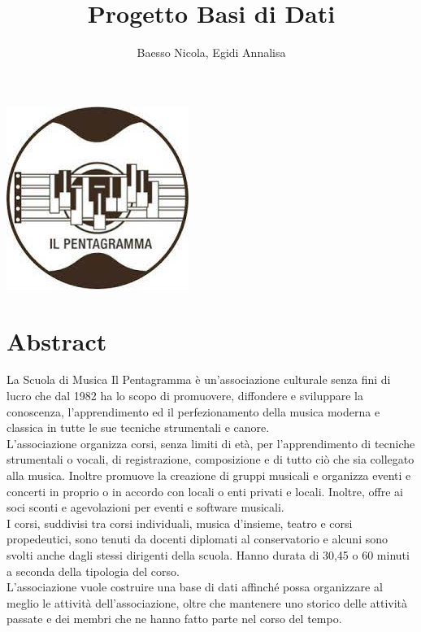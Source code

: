 \documentclass[12pt]{article}
\title{Progetto Basi di Dati}
\author{Baesso Nicola, Egidi Annalisa}
\begin{document}

\maketitle %
\begin{center} %
	\includegraphics{logo.jpeg}	
\end{center}
\newpage %
\tableofcontents %
\newpage
\section{Abstract}
La Scuola di Musica Il Pentagramma è un’associazione culturale senza fini di lucro che dal 1982 ha lo scopo di promuovere, diffondere e sviluppare la conoscenza, l’apprendimento ed il perfezionamento della musica moderna e classica in tutte le sue tecniche strumentali e canore.\\
L'associazione organizza corsi, senza limiti di età, per l'apprendimento di tecniche strumentali o vocali, di registrazione, composizione e di tutto ciò che sia collegato alla musica. Inoltre promuove la creazione di gruppi musicali e organizza eventi e concerti in proprio o in accordo con locali o enti privati e locali. Inoltre, offre ai soci sconti e agevolazioni per eventi e software musicali.\\
I corsi, suddivisi tra corsi individuali, musica d'insieme, teatro e corsi propedeutici, sono tenuti da docenti diplomati al conservatorio e alcuni sono svolti anche dagli stessi dirigenti della scuola. Hanno durata di 30,45 o 60 minuti a seconda della tipologia del corso.\\
L'associazione vuole costruire una base di dati affinché possa organizzare al meglio le attività dell'associazione, oltre che mantenere uno storico delle attività passate e dei membri che ne hanno fatto parte nel corso del tempo.
\end{document}
